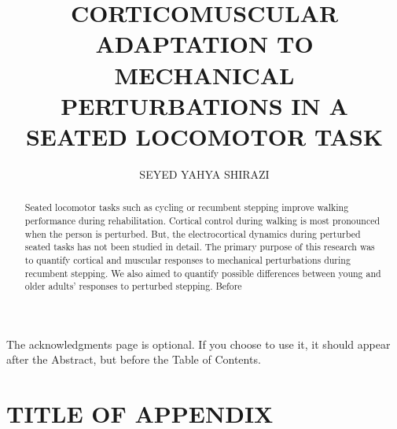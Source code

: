 \documentclass{UCF_ETD}
\title{\uppercase{Corticomuscular adaptation to mechanical perturbations in a seated locomotor task}} %
\author{\uppercase{Seyed Yahya Shirazi}} %
\begin{document}
\frontmatter

\maketitle


\begin{abstract}
Seated locomotor tasks such as cycling or recumbent stepping improve walking performance during rehabilitation. Cortical control during walking is most pronounced when the person is perturbed. But, the electrocortical dynamics during perturbed seated tasks has not been studied in detail. The primary purpose of this research was to quantify cortical and muscular responses to mechanical perturbations during recumbent stepping. We also aimed to quantify possible differences between young and older adults' responses to perturbed stepping. Before 
\end{abstract}

\dedication{Dedicated to my love, Maryam.}

\begin{acknowledgments}
The acknowledgments page is optional. If you choose to use it, it should appear after the Abstract, but before the Table of Contents.
\end{acknowledgments}

\tableofcontents

\listoffigures

\listoftables

\mainmatter





\appendix

\chapter{TITLE OF APPENDIX}
\newpage
\end{document}
